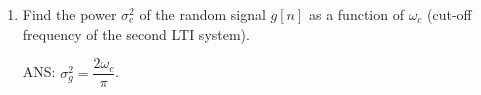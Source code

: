 \begin{q}{}
\begin{enumerate}[label=(\alph*)]
    \item Find the power $\sigma_{e}^{2}$ of the random signal $g[n]$ as a function of $\omega_c$ (cut-off frequency of the second LTI system).
    \begin{flushright}
        \begin{blueenv}
            ANS: $\sigma_{g}^2 = \dfrac{2\omega_c}{\pi}$.
        \end{blueenv}
    \end{flushright}
\end{enumerate}





\end{q}
